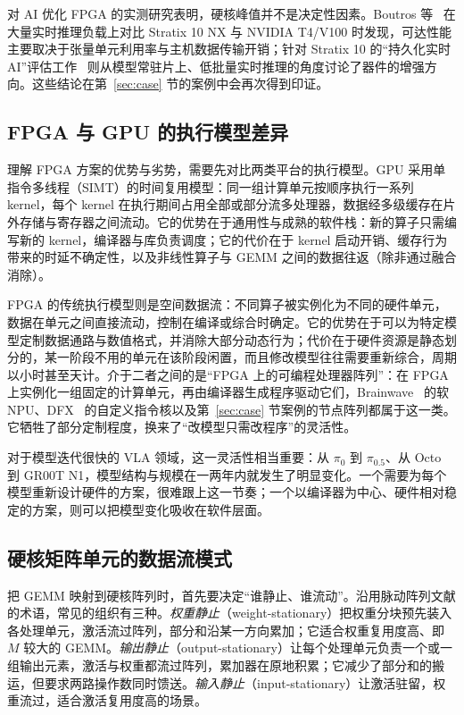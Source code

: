 \documentclass[a4paper,10.5pt]{ctexart}
\newcommand{\pizero}{$\pi_0$}
\newcommand{\pihalf}{$\pi_{0.5}$}
\begin{document}
对 AI 优化 FPGA 的实测研究表明，硬核峰值并不是决定性因素。Boutros 等~\cite{s10nx_fpt} 在大量实时推理负载上对比 Stratix 10 NX 与 NVIDIA T4/V100 时发现，可达性能主要取决于张量单元利用率与主机数据传输开销；针对 Stratix 10 的“持久化实时 AI”评估工作~\cite{s10_persistent} 则从模型常驻片上、低批量实时推理的角度讨论了器件的增强方向。这些结论在第~\ref{sec:case} 节的案例中会再次得到印证。


\subsection{FPGA 与 GPU 的执行模型差异}\label{sec:execmodel}

理解 FPGA 方案的优势与劣势，需要先对比两类平台的执行模型。GPU 采用单指令多线程（SIMT）的时间复用模型：同一组计算单元按顺序执行一系列 kernel，每个 kernel 在执行期间占用全部或部分流多处理器，数据经多级缓存在片外存储与寄存器之间流动。它的优势在于通用性与成熟的软件栈：新的算子只需编写新的 kernel，编译器与库负责调度；它的代价在于 kernel 启动开销、缓存行为带来的时延不确定性，以及非线性算子与 GEMM 之间的数据往返（除非通过融合消除）。

FPGA 的传统执行模型则是空间数据流：不同算子被实例化为不同的硬件单元，数据在单元之间直接流动，控制在编译或综合时确定。它的优势在于可以为特定模型定制数据通路与数值格式，并消除大部分动态行为；代价在于硬件资源是静态划分的，某一阶段不用的单元在该阶段闲置，而且修改模型往往需要重新综合，周期以小时甚至天计。介于二者之间的是“FPGA 上的可编程处理器阵列”：在 FPGA 上实例化一组固定的计算单元，再由编译器生成程序驱动它们，Brainwave~\cite{brainwave} 的软 NPU、DFX~\cite{dfx} 的自定义指令核以及第~\ref{sec:case} 节案例的节点阵列都属于这一类。它牺牲了部分定制程度，换来了“改模型只需改程序”的灵活性。

对于模型迭代很快的 VLA 领域，这一灵活性相当重要：从 \pizero{} 到 \pihalf{}、从 Octo 到 GR00T N1，模型结构与规模在一两年内就发生了明显变化。一个需要为每个模型重新设计硬件的方案，很难跟上这一节奏；一个以编译器为中心、硬件相对稳定的方案，则可以把模型变化吸收在软件层面。

\subsection{硬核矩阵单元的数据流模式}\label{sec:dataflow}

把 GEMM 映射到硬核阵列时，首先要决定“谁静止、谁流动”。沿用脉动阵列文献的术语，常见的组织有三种。\emph{权重静止}（weight-stationary）把权重分块预先装入各处理单元，激活流过阵列，部分和沿某一方向累加；它适合权重复用度高、即 $M$ 较大的 GEMM。\emph{输出静止}（output-stationary）让每个处理单元负责一个或一组输出元素，激活与权重都流过阵列，累加器在原地积累；它减少了部分和的搬运，但要求两路操作数同时馈送。\emph{输入静止}（input-stationary）让激活驻留，权重流过，适合激活复用度高的场景。
\end{document}
